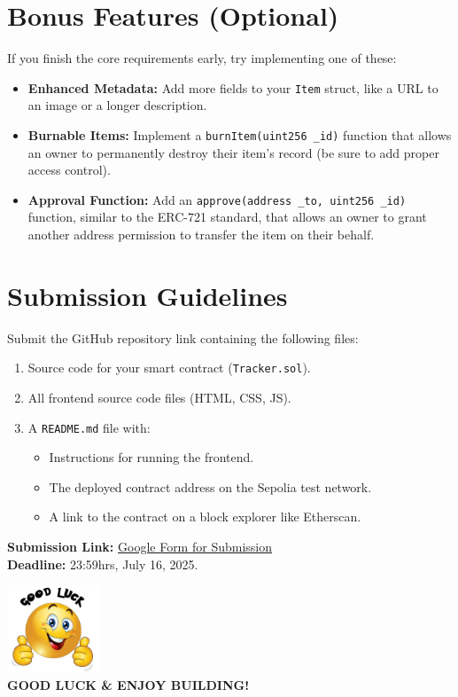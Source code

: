 \documentclass[12pt]{extarticle}
\newcommand{\allthebest}{\includegraphics[height=7em]{all_the_best.png}}
\begin{document}
\section*{Bonus Features (Optional)}
If you finish the core requirements early, try implementing one of these:
\begin{itemize}
    \item \textbf{Enhanced Metadata:} Add more fields to your \texttt{Item} struct, like a URL to an image or a longer description.
    \item \textbf{Burnable Items:} Implement a \texttt{burnItem(uint256 \_id)} function that allows an owner to permanently destroy their item's record (be sure to add proper access control).
    \item \textbf{Approval Function:} Add an \texttt{approve(address \_to, uint256 \_id)} function, similar to the ERC-721 standard, that allows an owner to grant another address permission to transfer the item on their behalf.
\end{itemize}

\section*{Submission Guidelines}
Submit the GitHub repository link containing the following files:
\begin{enumerate}
    \item Source code for your smart contract (\texttt{Tracker.sol}).
    \item All frontend source code files (HTML, CSS, JS).
    \item A \texttt{README.md} file with:
          \begin{itemize}
              \item Instructions for running the frontend.
              \item The deployed contract address on the Sepolia test network.
              \item A link to the contract on a block explorer like Etherscan.
          \end{itemize}
\end{enumerate}
\textbf{Submission Link:} \href{https://docs.google.com/forms/d/e/1FAIpQLSdmxgZxOlkoVcF6xlZEaj_lqkWGQj8E_YcVuDleKsPcJAVjhA/viewform?usp=sharing&ouid=111865655829457855660}{Google Form for Submission}\\
\textbf{Deadline:} 23:59hrs, July 16, 2025.\\
\vspace{2cm}

\begin{center}
    \allthebest\\
    \Large \textbf{GOOD LUCK \& ENJOY BUILDING!}
\end{center}
\end{document}

